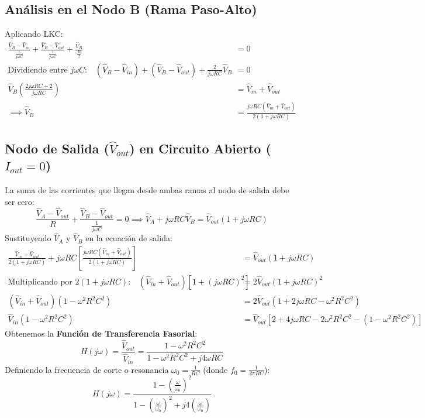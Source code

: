 \documentclass[11pt,a4paper,twoside]{article}
\begin{document}
\subsection*{Análisis en el Nodo B (Rama Paso-Alto)}
Aplicando LKC:
\begin{align*}
    \frac{\hat{V}_B - \hat{V}_{in}}{\frac{1}{j\omega C}} + \frac{\hat{V}_B - \hat{V}_{out}}{\frac{1}{j\omega C}} + \frac{\hat{V}_B}{\frac{R}{2}} &= 0 \\
    \text{Dividiendo entre } j\omega C\text{:} \quad (\hat{V}_B - \hat{V}_{in}) + (\hat{V}_B - \hat{V}_{out}) + \frac{2}{j\omega RC} \hat{V}_B &= 0 \\
    \hat{V}_B \left( \frac{2j\omega RC + 2}{j\omega RC} \right) &= \hat{V}_{in} + \hat{V}_{out} \\
    \implies \hat{V}_B &= \frac{j\omega RC (\hat{V}_{in} + \hat{V}_{out})}{2(1 + j\omega RC)}
\end{align*}

\subsection*{Nodo de Salida ($\hat{V}_{out}$) en Circuito Abierto ($I_{out} = 0$)}
La suma de las corrientes que llegan desde ambas ramas al nodo de salida debe ser cero:
\begin{equation*}
    \frac{\hat{V}_A - \hat{V}_{out}}{R} + \frac{\hat{V}_B - \hat{V}_{out}}{\frac{1}{j\omega C}} = 0 \implies \hat{V}_A + j\omega RC \hat{V}_B = \hat{V}_{out} (1 + j\omega RC)
\end{equation*}
Sustituyendo $\hat{V}_A$ y $\hat{V}_B$ en la ecuación de salida:
\begin{align*}
    \frac{\hat{V}_{in} + \hat{V}_{out}}{2(1 + j\omega RC)} + j\omega RC \left[ \frac{j\omega RC (\hat{V}_{in} + \hat{V}_{out})}{2(1 + j\omega RC)} \right] &= \hat{V}_{out} (1 + j\omega RC) \\
    \text{Multiplicando por } 2(1 + j\omega RC)\text{:} \quad (\hat{V}_{in} + \hat{V}_{out}) \left[ 1 + (j\omega RC)^2 \right] &= 2\hat{V}_{out} (1 + j\omega RC)^2 \\
    (\hat{V}_{in} + \hat{V}_{out}) (1 - \omega^2 R^2 C^2) &= 2\hat{V}_{out} (1 + 2j\omega RC - \omega^2 R^2 C^2) \\
    \hat{V}_{in} (1 - \omega^2 R^2 C^2) &= \hat{V}_{out} \left[ 2 + 4j\omega RC - 2\omega^2 R^2 C^2 - (1 - \omega^2 R^2 C^2) \right]
\end{align*}
Obtenemos la \textbf{Función de Transferencia Fasorial}:
\begin{equation*}
    H(j\omega) = \frac{\hat{V}_{out}}{\hat{V}_{in}} = \frac{1 - \omega^2 R^2 C^2}{1 - \omega^2 R^2 C^2 + j 4\omega RC}
\end{equation*}
Definiendo la frecuencia de corte o resonancia $\omega_0 = \frac{1}{RC}$ (donde $f_0 = \frac{1}{2\pi RC}$):
\begin{equation}
    H(j\omega) = \frac{1 - \left(\frac{\omega}{\omega_0}\right)^2}{1 - \left(\frac{\omega}{\omega_0}\right)^2 + j 4 \left(\frac{\omega}{\omega_0}\right)}
\end{equation}
\end{document}
